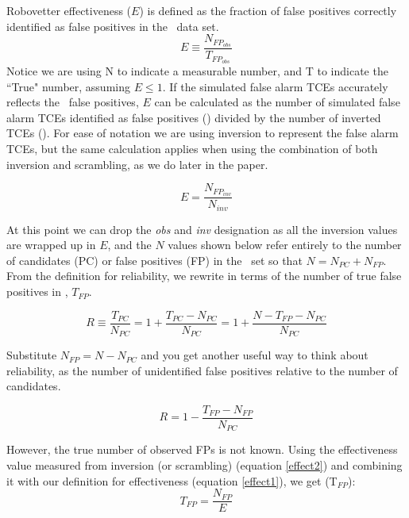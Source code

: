 Robovetter effectiveness ($E$) is defined as the fraction of false positives correctly identified as false positives in the \opstce\ data set. 
\begin{equation}
\label{effect1}
E \equiv \frac{N_{FP_{obs}}}{T_{FP_{obs}}}
\end{equation}
Notice we are using N to indicate a measurable number, and T to indicate the ``True" number, assuming $E\leq 1 $.  If the simulated false alarm TCEs accurately reflects the \opstce\ false positives, $E$ can be calculated as the number of simulated false alarm TCEs identified as false positives (\invfp) divided by the number of inverted TCEs (\invN). For ease of notation we are using inversion to represent the false alarm TCEs, but the same calculation applies when using the combination of both inversion and scrambling, as we do later in the paper.

\begin{equation}
\label{effect2}
E = \frac{N_{FP_{inv}}}{N_{inv}}
\end{equation}

At this point we can drop the \textit{obs} and \textit{inv} designation as all the inversion values are wrapped up in $E$, and the $N$ values shown below refer entirely to the number of candidates (PC) or false positives (FP) in the \opstce\ set so that $N=N_{PC} + N_{FP}$. From the definition for reliability, we rewrite in terms of the number of true false positives in \opstce, $T_{FP}$.

\begin{equation}
R \equiv \frac{T_{PC}}{N_{PC}} =  1 + \frac{T_{PC}-N_{PC}}{N_{PC}} 
= 1 + \frac{N - T_{FP} - N_{PC}}{N_{PC}}
\end{equation}

Substitute $N_{FP}=N-N_{PC}$ and you get another useful way to think about reliability, as the number of unidentified false positives relative to the number of candidates.

\begin{equation}
\label{eq:rel2}
R = 1 - \frac{T_{FP}-N_{FP}}{N_{PC}}
\end{equation}

However, the true number of observed FPs is not known. Using the effectiveness value measured from inversion (or scrambling) (equation \ref{effect2}) and combining it with our definition for effectiveness (equation \ref{effect1}), we get (T$_{FP}$):
\begin{equation}
T_{FP} = \frac{N_{FP}}{E} 
\end{equation}

